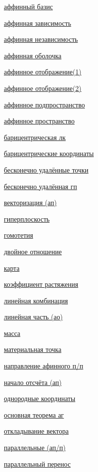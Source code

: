 \documentclass[a4paper,100pt]{article}
\theoremstyle{indented}
\theoremstyle{definition}
\theoremstyle{remark}
\begin{document}
\begin{multicols}{2}

    \hyperlink{s24}{аффинный базис} \ 

    \hyperlink{s22}{аффинная зависимость} \ 
    
    \hyperlink{s23}{аффинная независимость} \ 
    
    \hyperlink{s21}{аффинная оболочка} \ 
    
    \hyperlink{s26}{аффинное отображение(1)} \ 
    
    \hyperlink{s28}{аффинное отображение(2)} \ 
    
    \hyperlink{s13}{аффинное подпространство} \ 
    
    \hyperlink{s1}{аффинное пространство} \
    
    \hyperlink{s8}{барицентрическая лк} \
    
    \hyperlink{s25}{барицентрические координаты} \ 
    
    \hyperlink{s38}{бесконечно удалённые точки} \ 

    \hyperlink{s39}{бесконечно удалённая гп} \
    
    \hyperlink{s6}{векторизация (ап)} \ 
    
    \hyperlink{s19}{гиперплоскость} \ 
    
    \hyperlink{s29}{гомотетия} \ 

    \hyperlink{s41}{двойное отношение} \

    \hyperlink{s40}{карта} \
    
    \hyperlink{s30}{коэффициент растяжения} \ 
    
    \hyperlink{s7}{линейная комбинация} \ 
    
    \hyperlink{s27}{линейная часть (ао)} \ 
    
    \hyperlink{s11}{масса} \ 
    
    \hyperlink{s10}{материальная точка} \ 
    
    \hyperlink{s14}{направление афинного п/п} \ 
    
    \hyperlink{s5}{начало отсчёта (ап)} \ 
    
    \hyperlink{s36}{однородные координаты} \ 
    
    \hyperlink{s31}{основная теорема аг} \ 
    
    \hyperlink{s4}{откладывание вектора} \ 
    
    \hyperlink{s17}{параллельные (ап/п)} \ 
    
    \hyperlink{s16}{параллельный перенос} \ 
    

\end{multicols}
\end{document}
